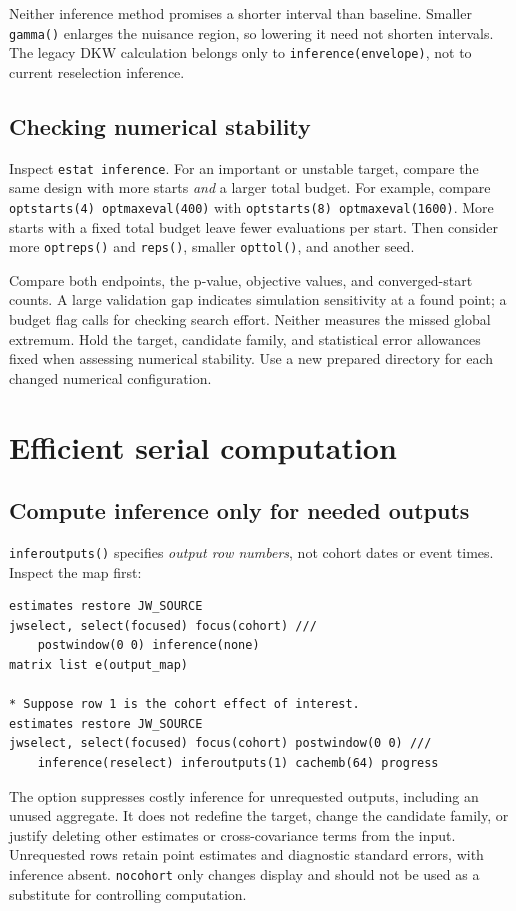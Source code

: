 \documentclass[11pt]{article}
\newcommand{\cmd}[1]{\texttt{#1}}
\begin{document}
Neither inference method promises a shorter interval than baseline.
Smaller \cmd{gamma()} enlarges the nuisance region, so lowering it need not
shorten intervals. The legacy DKW calculation belongs only to
\cmd{inference(envelope)}, not to current reselection inference.

\subsection{Checking numerical stability}
Inspect \cmd{estat inference}. For an important or unstable target, compare
the same design with more starts \emph{and} a larger total budget. For example,
compare \cmd{optstarts(4) optmaxeval(400)} with
\cmd{optstarts(8) optmaxeval(1600)}. More starts with a fixed total budget
leave fewer evaluations per start. Then consider more \cmd{optreps()} and
\cmd{reps()}, smaller \cmd{opttol()}, and another seed.

Compare both endpoints, the p-value, objective values, and converged-start
counts. A large validation gap indicates simulation sensitivity at a found
point; a budget flag calls for checking search effort. Neither measures the
missed global extremum. Hold the target, candidate family, and statistical
error allowances fixed when assessing numerical stability. Use a new prepared
directory for each changed numerical configuration.

\section{Efficient serial computation}
\subsection{Compute inference only for needed outputs}
\cmd{inferoutputs()} specifies \emph{output row numbers}, not cohort dates
or event times. Inspect the map first:
\begin{lstlisting}
estimates restore JW_SOURCE
jwselect, select(focused) focus(cohort) ///
    postwindow(0 0) inference(none)
matrix list e(output_map)

* Suppose row 1 is the cohort effect of interest.
estimates restore JW_SOURCE
jwselect, select(focused) focus(cohort) postwindow(0 0) ///
    inference(reselect) inferoutputs(1) cachemb(64) progress
\end{lstlisting}
The option suppresses costly inference for unrequested outputs, including an
unused aggregate. It does not redefine the target, change the candidate family,
or justify deleting other estimates or cross-covariance terms from the input.
Unrequested rows retain point estimates and diagnostic standard errors, with
inference absent. \cmd{nocohort} only changes display and should not be used
as a substitute for controlling computation.
\end{document}
